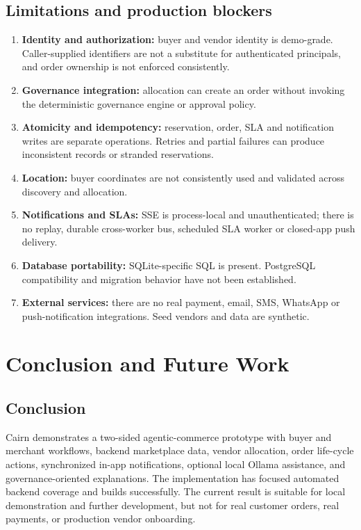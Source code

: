 \documentclass[12pt,a4paper]{report}
\begin{document}
\section{Limitations and production blockers}
\begin{enumerate}
  \item \textbf{Identity and authorization:} buyer and vendor identity is
        demo-grade. Caller-supplied identifiers are not a substitute for
        authenticated principals, and order ownership is not enforced
        consistently.
  \item \textbf{Governance integration:} allocation can create an order
        without invoking the deterministic governance engine or approval
        policy.
  \item \textbf{Atomicity and idempotency:} reservation, order, SLA and
        notification writes are separate operations. Retries and partial
        failures can produce inconsistent records or stranded reservations.
  \item \textbf{Location:} buyer coordinates are not consistently used and
        validated across discovery and allocation.
  \item \textbf{Notifications and SLAs:} SSE is process-local and unauthenticated;
        there is no replay, durable cross-worker bus, scheduled SLA worker or
        closed-app push delivery.
  \item \textbf{Database portability:} SQLite-specific SQL is present.
        PostgreSQL compatibility and migration behavior have not been
        established.
  \item \textbf{External services:} there are no real payment, email, SMS,
        WhatsApp or push-notification integrations. Seed vendors and data are
        synthetic.
\end{enumerate}

\chapter{Conclusion and Future Work}

\section{Conclusion}
Cairn demonstrates a two-sided agentic-commerce prototype with buyer and
merchant workflows, backend marketplace data, vendor allocation, order
life-cycle actions, synchronized in-app notifications, optional local Ollama
assistance, and governance-oriented explanations. The implementation has
focused automated backend coverage and builds successfully. The current
result is suitable for local demonstration and further development, but not
for real customer orders, real payments, or production vendor onboarding.
\end{document}
